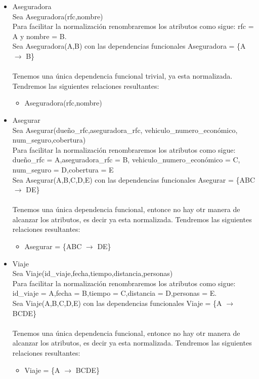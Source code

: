 \documentclass{article}
\begin{document}
\begin{itemize}
\item Aseguradora\\
Sea Aseguradora(rfc,nombre)\\
Para facilitar la normalización renombraremos los atributos como sigue:
rfc = A y nombre = B.\\
Sea Aseguradora(A,B) con las dependencias funcionales 
Aseguradora = \{A $\rightarrow$ B\} \\
\\
Tenemos una única dependencia funcional trivial, ya esta normalizada.
Tendremos las siguientes relaciones resultantes:
\begin{itemize}
\item Aseguradora(rfc,nombre)\\
\end{itemize}


\item Asegurar\\
Sea Asegurar(dueño\_rfc,aseguradora\_rfc, vehiculo\_numero\_económico, num\_seguro,cobertura)\\
Para facilitar la normalización renombraremos los atributos como sigue:
dueño\_rfc = A,aseguradora\_rfc = B, vehiculo\_numero\_económico = C, num\_seguro = D,cobertura = E\\
Sea Asegurar(A,B,C,D,E) con las dependencias funcionales 
Asegurar = \{ABC $\rightarrow$ DE\} \\
\\
Tenemos una única dependencia funcional, entonce no hay otr manera 
de alcanzar los atributos, es decir ya esta normalizada.
Tendremos las siguientes relaciones resultantes:
\begin{itemize}
\item Asegurar = \{ABC $\rightarrow$ DE\} \\
\end{itemize}


\item Viaje\\
Sea Viaje(id\_viaje,fecha,tiempo,distancia,personas)\\
Para facilitar la normalización renombraremos los atributos como sigue:
id\_viaje = A,fecha = B,tiempo = C,distancia = D,personas = E.\\
Sea Viaje(A,B,C,D,E) con las dependencias funcionales
Viaje = \{A $\rightarrow$ BCDE\} \\
\\
Tenemos una única dependencia funcional, entonce no hay otr manera 
de alcanzar los atributos, es decir ya esta normalizada.
Tendremos las siguientes relaciones resultantes:
\begin{itemize}
\item Viaje = \{A $\rightarrow$ BCDE\} \\
\end{itemize}




\end{itemize}
\end{document}
